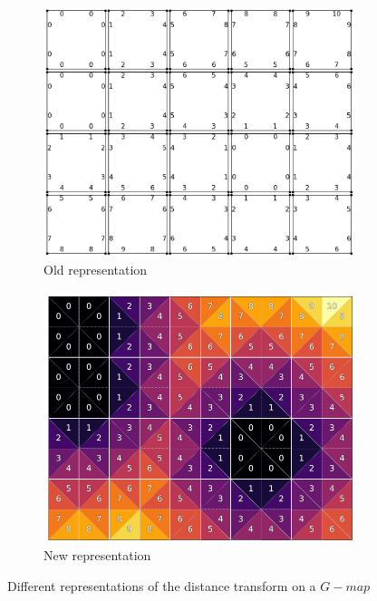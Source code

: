 \begin{figure}
    \centering
    \begin{subfigure}{0.49\textwidth}
        \centering
        \includegraphics[width=\textwidth]{figures/gmap_dt_old.png}
        \caption{Old representation}
        \label{fig:gmap_dt_old}
    \end{subfigure}
    \hfill
    \begin{subfigure}{0.49\textwidth}
        \centering
        \includegraphics[width=\textwidth]{figures/gmap_dt_new.png}
        \caption{New representation}
        \label{fig:gmap_dt_new}
    \end{subfigure}
    \caption{Different representations of the distance transform on a $G-map$}
    \label{fig:gmap_dt}
\end{figure}


